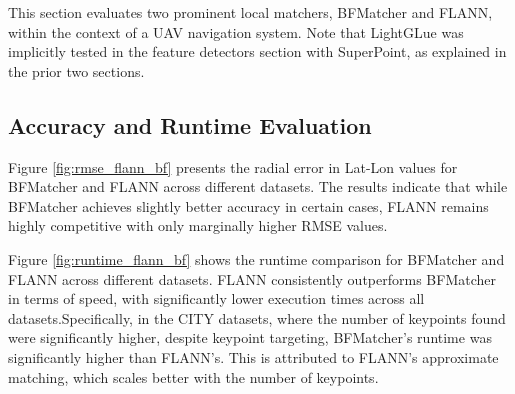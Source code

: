 This section evaluates two prominent local matchers, BFMatcher and FLANN, within the context of a UAV navigation system. Note that LightGLue was implicitly tested in the feature detectors section with SuperPoint, as explained in the prior two sections. 

\subsection{Accuracy and Runtime Evaluation}

Figure \ref{fig:rmse_flann_bf} presents the radial error in Lat-Lon values for BFMatcher and FLANN across different datasets. The results indicate that while BFMatcher achieves slightly better accuracy in certain cases, FLANN remains highly competitive with only marginally higher RMSE values.

Figure \ref{fig:runtime_flann_bf} shows the runtime comparison for BFMatcher and FLANN across different datasets. FLANN consistently outperforms BFMatcher in terms of speed, with significantly lower execution times across all datasets.Specifically, in the CITY datasets, where the number of keypoints found were significantly higher, despite keypoint targeting, BFMatcher's runtime was significantly higher than FLANN's. This is attributed to FLANN's approximate matching, which scales better with the number of keypoints.

